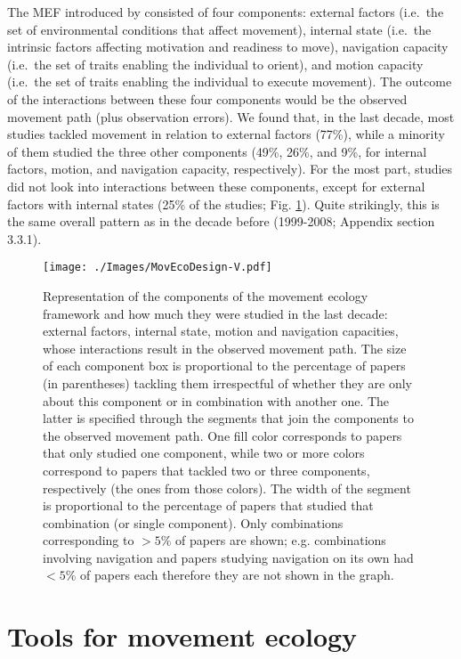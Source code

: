 \documentclass[a4paper,12pt]{article}
\begin{document}
The MEF introduced by \cite{Nathan2008} consisted of four components: external factors
(i.e.~the set of environmental conditions that affect movement),
internal state (i.e.~the intrinsic factors affecting motivation and
readiness to move), navigation capacity (i.e.~the set of traits enabling
the individual to orient), and motion capacity (i.e.~the set of traits
enabling the individual to execute movement). The outcome of the
interactions between these four components would be the observed
movement path (plus observation errors). We found that, in the last
decade, most studies tackled movement in relation to external factors
(77\%), while a minority of them studied the three other components
(49\%, 26\%, and 9\%, for internal factors, motion, and navigation
capacity, respectively). For the most part, studies did not look into
interactions between these components, except for external factors with
internal states (25\% of the studies; Fig. \ref{fig:framework}). Quite
strikingly, this is the same overall pattern as in the decade before
(1999-2008; Appendix section 3.3.1).


\begin{figure}
	\texttt{[image: ./Images/MovEcoDesign-V.pdf]}
	\caption{Representation of the components of the movement ecology framework and how much they were studied in the last decade: external factors, internal state, motion and navigation capacities, whose interactions result in the observed movement path. 
		The size of each component box is proportional to the percentage of papers (in parentheses) tackling them irrespectful of whether they are only about this component or in combination with another one. The latter is specified through the segments that join the components to the observed movement path. One fill color corresponds to papers that only studied one component, while two or more colors correspond to papers that tackled two or three components, respectively (the ones from those colors). The width of the segment is proportional to the percentage of papers that studied that combination (or single component). Only combinations corresponding to $>5\%$ of papers are shown; e.g. combinations involving navigation and papers studying navigation on its own had $<5\%$ of papers each therefore they are not shown in the graph.}
	\label{fig:framework}
\end{figure}

\section*{Tools for movement ecology}
\end{document}

